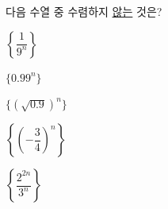 다음 수열 중 수렴하지 \underline{않는} 것은?
\begin{choices32}{\rule[-3ex]{0pt}{8ex}$\left\{\dfrac{1}{9^n}\right\}$}{\rule[-3ex]{0pt}{8ex}$\{0.99^n\}$}{\rule[-3ex]{0pt}{8ex}$\{(\sqrt{0.9})^n\}$}{\rule[-3ex]{0pt}{8ex}$\left\{\left(-\dfrac{3}{4}\right)^n\right\}$}{\rule[-3ex]{0pt}{8ex}$\left\{\dfrac{2^{2n}}{3^n}\right\}$}\end{choices32}
